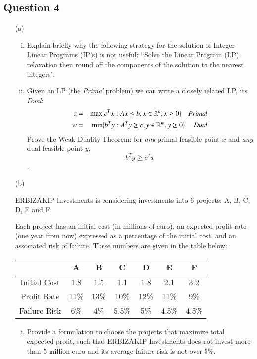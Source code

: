 \documentclass[12pt]{article}
\begin{document}
		\subsection*{Question 4}
		\begin{itemize}
			\item[(a)]
\begin{enumerate}[(i)]
\item Explain briefly why the following strategy for the solution of Integer
Linear Programs (IP’s) is not useful: ``Solve the Linear Program (LP) relaxation
then round off the components of the solution to the nearest integers". 
\item Given an LP (the \emph{Primal} problem) we can write a closely related LP, its \emph{Dual}:
\begin{eqnarray*}
										z &=& \max\{c^T x : Ax \le b,  x \in \mathbb{R}^n, x \ge 0 \}\quad \emph{Primal}\label{eq:lp-primal-1}\\
										w&=&    \min \{b^T  y : A^T y  \ge c,  y \in \mathbb{R}^m, y  \ge 0\}. \quad\emph{Dual}\label{eq:lp-dual-1}
\end{eqnarray*}
Prove the Weak Duality Theorem: for \emph{any} primal feasible
point $x$ and \emph{any} dual feasible point $y$, $$ b^T y \ge c^T x$$.
\end{enumerate}	
			\item[(b)]
			
			ERBIZAKIP Investments is considering investments into 6 projects: A, B, C, D, E and F.
			
			Each project has an initial cost (in millions of euro), an expected profit rate (one year from now) expressed as a
			percentage of the initial cost, and an associated risk of failure.
			These numbers are given in the table below:
			
			\begin{center}
			\begin{tabular}{|c||c|c|c|c|c|c|}
				\hline  & A & B & C & D & E & F \\
				\hline Initial Cost & 1.8 & 1.5 & 1.1 & 1.8 & 2.1 & 3.2 \\
				\hline Profit Rate & 11\% & 13\% & 10\% & 12\% & 11\% & 9\% \\
				\hline Failure Risk & 6\% & 4\% & 5.5\% & 5\% & 4.5\%  & 4.5\%\\
				\hline
			\end{tabular}
		\end{center}
			\begin{enumerate}[(i)] \item  Provide a formulation to choose the projects that maximize total
				expected profit, such that ERBIZAKIP Investments does not invest more than
				5 million euro and its average failure risk is not over 5\%.
				

\end{enumerate}
\end{itemize}
\end{document}
